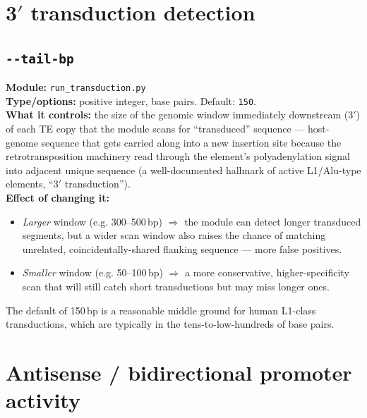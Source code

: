 \documentclass[11pt]{article}
\newcommand{\param}[1]{\subsection*{\texttt{-\/-#1}}}
\begin{document}
\section{3$'$ transduction detection}

\param{tail-bp}
\textbf{Module:} \texttt{run\_transduction.py}\\
\textbf{Type/options:} positive integer, base pairs. Default: \texttt{150}.\\
\textbf{What it controls:} the size of the genomic window immediately downstream
(3$'$) of each TE copy that the module scans for ``transduced'' sequence — host-genome
sequence that gets carried along into a new insertion site because the
retrotransposition machinery read through the element's polyadenylation signal into
adjacent unique sequence (a well-documented hallmark of active L1/Alu-type elements,
``3$'$ transduction'').\\
\textbf{Effect of changing it:}
\begin{itemize}[leftmargin=1.4em,topsep=2pt,itemsep=2pt]
  \item \emph{Larger} window (e.g. 300--500\,bp) $\Rightarrow$ the module can detect
    longer transduced segments, but a wider scan window also raises the chance of
    matching unrelated, coincidentally-shared flanking sequence — more false positives.
  \item \emph{Smaller} window (e.g. 50--100\,bp) $\Rightarrow$ a more conservative,
    higher-specificity scan that will still catch short transductions but may miss
    longer ones.
\end{itemize}
The default of 150\,bp is a reasonable middle ground for human L1-class transductions,
which are typically in the tens-to-low-hundreds of base pairs.

\section{Antisense / bidirectional promoter activity}
\end{document}
